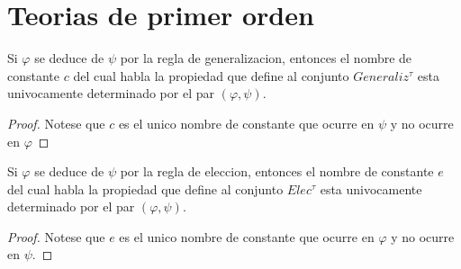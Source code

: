 \section{Teorias de primer orden}

  \begin{lemma}
    Si \(\varphi \) se deduce de \(\psi \) por la regla de generalizacion, entonces el nombre de constante \(c\) del cual habla la propiedad que define al conjunto \(Generaliz^{\tau }\) esta univocamente determinado por el par \( (\varphi ,\psi )\).
  \end{lemma}
  \begin{proof}
    Notese que \(c\) es el unico nombre de constante que ocurre en \(\psi \) y no ocurre en \(\varphi \)
  \end{proof}

  \begin{lemma}
    Si \(\varphi \) se deduce de \(\psi \) por la regla de eleccion, entonces el nombre de constante \(e\) del cual habla la propiedad que define al conjunto \( Elec^{\tau }\) esta univocamente determinado por el par \((\varphi ,\psi )\).
  \end{lemma}
  \begin{proof}
    Notese que \(e\) es el unico nombre de constante que ocurre en \(\varphi \) y no ocurre en \(\psi \).
  \end{proof}


